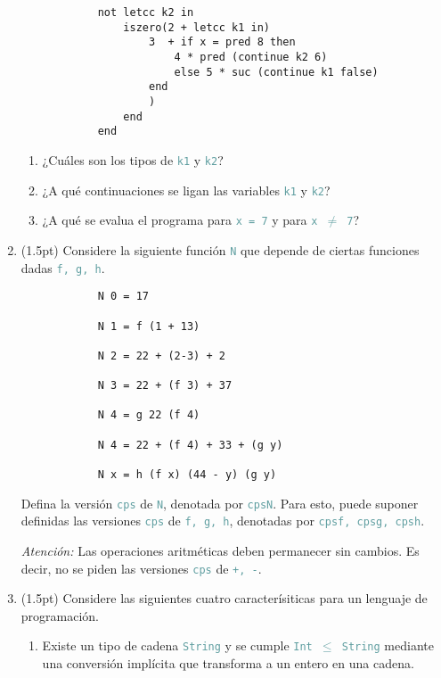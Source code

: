 \documentclass{article}
\newcommand{\tx}[1]{\textcolor{CadetBlue} {\texttt{#1}}}
\newcommand{\ti}[1]{\textcolor{RoyalPurple} {\textit{#1}}}
\newcommand{\pt}[1]{\textcolor{RoyalPurple}{(#1pt)}}
\begin{document}
\begin{enumerate}
        \begin{verbatim}
            not letcc k2 in
                iszero(2 + letcc k1 in)
                    3  + if x = pred 8 then 
                        4 * pred (continue k2 6) 
                        else 5 * suc (continue k1 false)
                    end
                    )
                end
            end
        \end{verbatim}
        \begin{enumerate}
            \item ¿Cuáles son los tipos de \tx{k1} y \tx{k2}?
            \item ¿A qué continuaciones se ligan las variables \tx{k1} y 
            \tx{k2}?
            \item ¿A qué se evalua el programa para \tx{x = 7} y para 
            \tx{x $\neq$ 7}?
        \end{enumerate}

        \item \pt{1.5} Considere la siguiente función \tx{N} que depende de
        ciertas funciones dadas \tx{f, g, h}.

        \begin{verbatim}
            N 0 = 17

            N 1 = f (1 + 13)

            N 2 = 22 + (2-3) + 2

            N 3 = 22 + (f 3) + 37

            N 4 = g 22 (f 4)

            N 4 = 22 + (f 4) + 33 + (g y)

            N x = h (f x) (44 - y) (g y)
        \end{verbatim}

        Defina la versión \tx{cps} de \tx{N}, denotada por \tx{cpsN}. Para esto,
        puede suponer definidas las versiones \tx{cps} de \tx{f, g, h},
        denotadas por \tx{cpsf, cpsg, cpsh}.

        \ti{Atención:} Las operaciones aritméticas deben permanecer sin cambios.
        Es decir, no se piden las versiones \tx{cps} de \tx{+, -}.

        \item \pt{1.5} Considere las siguientes cuatro caracterísiticas para un 
        lenguaje de programación.

        \begin{enumerate}
            \item Existe un tipo de cadena \tx{String} y se cumple 
            \tx{Int $\leq$ String} mediante una conversión implícita que 
            transforma a un entero en una cadena. 


\end{enumerate}
\end{enumerate}
\end{document}
